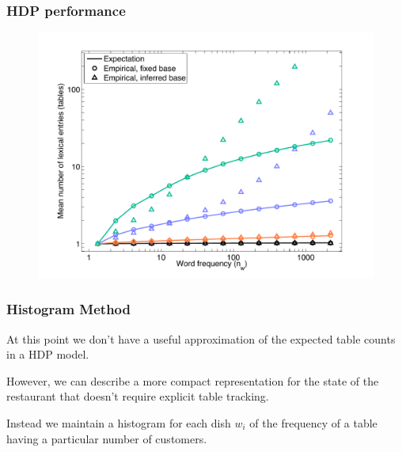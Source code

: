 \documentclass{beamer}
\newenvironment{unpacked_itemize}{
\begin{itemize}
  \setlength{\itemsep}{10pt}
  \setlength{\parskip}{0pt}
  \setlength{\parsep}{0pt}
}{\end{itemize}}
\begin{document}
\begin{frame}
\frametitle{HDP performance}
\begin{figure}
{\centering \includegraphics[scale=0.45]{code/plot3.pdf}}
\end{figure}
\end{frame}

\begin{frame}
\frametitle{Histogram Method}
\begin{unpacked_itemize}
  \item At this point we don't have a useful approximation of the expected table
    counts in a HDP model.
  \item However, we can describe a more compact representation for the state of the restaurant that doesn't require explicit table tracking.
  \item Instead we maintain a histogram for each dish $w_i$ of the frequency of a table having a particular number of customers.
\end{unpacked_itemize}
\end{frame}
\end{document}
